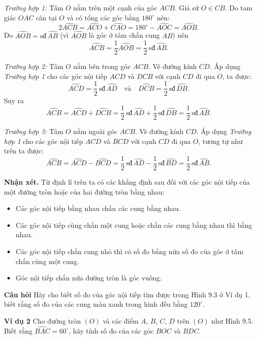 \begin{lesson}
    \textit{Trường hợp 1:} Tâm $O$ nằm trên một cạnh của góc $ACB$. Giả sử $O\in CB$. Do tam giác $OAC$ cân tại $O$ và có tổng các góc bằng $180^\circ$ nên:
    \[
        2\widehat{ACB}=\widehat{ACO}+\widehat{CAO}=180^\circ-\widehat{AOC}=\widehat{AOB}.
    \]
    Do $\widehat{AOB}=\text{sđ}\,\widehat{AB}$ (vì $\widehat{AOB}$ là góc ở tâm chắn cung $AB$) nên
    \[
        \widehat{ACB}=\dfrac{1}{2}\widehat{AOB}=\dfrac{1}{2}\,\text{sđ}\,\widehat{AB}.
    \]

    \textit{Trường hợp 2:} Tâm $O$ nằm bên trong góc $ACB$. Vẽ đường kính $CD$. Áp dụng \textit{Trường hợp 1} cho các góc nội tiếp $ACD$ và $DCB$ với cạnh $CD$ đi qua $O$, ta được:
    \[
        \widehat{ACD}=\dfrac{1}{2}\,\text{sđ}\,\widehat{AD}
        \quad\text{và}\quad
        \widehat{DCB}=\dfrac{1}{2}\,\text{sđ}\,\widehat{DB}.
    \]
    Suy ra
    \[
        \widehat{ACB}=\widehat{ACD}+\widehat{DCB}
        =\dfrac{1}{2}\,\text{sđ}\,\widehat{AD}+\dfrac{1}{2}\,\text{sđ}\,\widehat{DB}
        =\dfrac{1}{2}\,\text{sđ}\,\widehat{AB}.
    \]

    \textit{Trường hợp 3:} Tâm $O$ nằm ngoài góc $ACB$. Vẽ đường kính $CD$. Áp dụng \textit{Trường hợp 1} cho các góc nội tiếp $ACD$ và $BCD$ với cạnh $CD$ đi qua $O$, tương tự như trên ta được:
    \[
        \widehat{ACB}=\widehat{ACD}-\widehat{BCD}
        =\dfrac{1}{2}\,\text{sđ}\,\widehat{AD}-\dfrac{1}{2}\,\text{sđ}\,\widehat{BD}
        =\dfrac{1}{2}\,\text{sđ}\,\widehat{AB}.
    \]

    \textbf{Nhận xét.} Từ định lí trên ta có các khẳng định sau đối với các góc nội tiếp của một đường tròn hoặc của hai đường tròn bằng nhau:
    \begin{itemize}
        \item Các góc nội tiếp bằng nhau chắn các cung bằng nhau.
        \item Các góc nội tiếp cùng chắn một cung hoặc chắn các cung bằng nhau thì bằng nhau.
        \item Các góc nội tiếp chắn cung nhỏ thì có số đo bằng nửa số đo của góc ở tâm chắn cùng một cung.
        \item Góc nội tiếp chắn nửa đường tròn là góc vuông.
    \end{itemize}

    \textbf{Câu hỏi} Hãy cho biết số đo của góc nội tiếp tìm được trong Hình 9.3 ở Ví dụ 1, biết rằng số đo của các cung màu xanh trong hình đều bằng $120^\circ$.

    \answerline

    \textbf{Ví dụ 2} Cho đường tròn $(O)$ và các điểm $A$, $B$, $C$, $D$ trên $(O)$ như Hình 9.5. Biết rằng $\widehat{BAC}=60^\circ$, hãy tính số đo của các góc $BOC$ và $BDC$.


\end{lesson}
